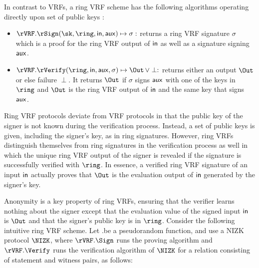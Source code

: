 In contrast to VRFs, a ring VRF scheme has the following algorithms operating directly upon
 set of public keys \ring:
\begin{itemize}
\item $\rVRF.\rSign(\sk,\ring,\msg, \aux) \mapsto \sigma:$
    returns a ring VRF signature $\sigma$ which is a proof for the ring VRF output of $ \mathsf{in} $ as well as a signature signing $ \mathsf{aux} $.
\item $\rVRF.\rVerify(\ring,\msg,\aux,\sigma) \mapsto \Out \, \lor \perp:$
    returns either an output $\Out$ or else failure $\perp$. It returns $ \Out $ if $ \sigma  $ signs $ \mathsf{aux} $ with one of the keys in $ \ring $ and $ \Out $ is the ring VRF output of $ \mathsf{in} $ and the same key that signs $ \mathsf{aux} $.
\end{itemize}


Ring VRF protocols deviate from VRF protocols in that the public key of the signer is not known during the verification process. Instead, a set of public keys is given, including the signer's key, as in ring signatures. However, ring VRFs distinguish themselves from ring signatures  in the verification process as well in which the unique ring VRF output of the signer is revealed if the signature is successfully verified with $\ring$. 
In essence, a verified ring VRF signature of an input  $ \mathsf{in} $ actually proves that $ \Out $ is the evaluation output of $ \mathsf{in} $ generated by the signer's key. 

Anonymity is a key property of ring VRFs, ensuring that the verifier learns nothing about the signer except that the  evaluation value of the signed input $ \mathsf{in} $ is $ \Out $ and that the signer's public key is in $ \ring $.
Consider the following intuitive ring VRF scheme.
Let \rVRF.\Eval be a pseudorandom function, and use a NIZK protocol $ \NIZK $, where $ \rVRF.\Sign $ runs the proving algorithm and $ \rVRF.\Verify $ runs the verification algorithm of $ \NIZK $ for a relation consisting of statement and witness pairs, as follows:



